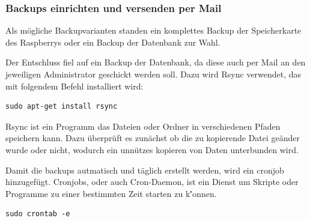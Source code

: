 \documentclass[11pt,a4paper]{article} %
\begin{document}
\subsubsection{Backups einrichten und versenden per Mail}
Als m\"ogliche Backupvarianten standen ein komplettes Backup der Speicherkarte des Raspberrys oder ein Backup der Datenbank zur Wahl.
\par
Der Entschluss fiel auf ein Backup der Datenbank, da diese auch per Mail an den jeweiligen Administrator geschickt werden soll. Dazu wird Rsync verwendet, das mit folgendem Befehl installiert wird:
\begin{frame}

\begin{lstlisting}
sudo apt-get install rsync
\end{lstlisting}
\end{frame}
 Rsync ist ein Programm das Dateien oder Ordner in verschiedenen Pfaden speichern kann. Dazu \"uberpr\"uft es zun\"achst ob die zu kopierende Datei ge\"ander wurde oder nicht, wodurch ein unn\"utzes kopieren von Daten unterbunden wird.
\par
Damit die backups autmatisch und t\"aglich erstellt werden, wird ein cronjob hinzugef\"ugt. Cronjobs, oder auch Cron-Daemon, ist ein Dienst um Skripte oder Programme zu einer bestimmten Zeit starten zu k\''onnen.
\begin{frame}

\begin{lstlisting}
sudo crontab -e
\end{lstlisting}
\end{frame}
\end{document}
